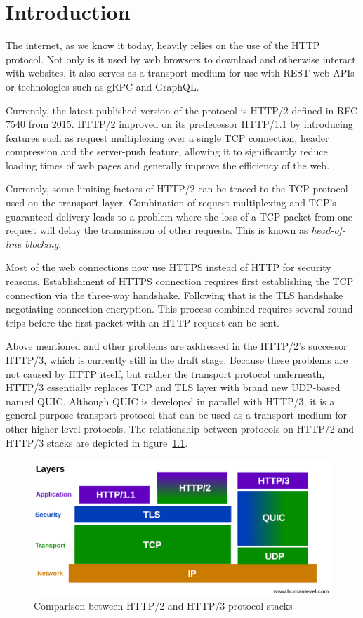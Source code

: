 \chapter{Introduction}

The internet, as we know it today, heavily relies on the use of the HTTP protocol. Not only is it
used by web browsers to download and otherwise interact with websites, it also serves as a transport
medium for use with REST web APIs or technologies such as gRPC and GraphQL\@.

Currently, the latest published version of the protocol is HTTP/2 defined in RFC 7540 from 2015.
HTTP/2 improved on its predecessor HTTP/1.1 by introducing features such as request multiplexing
over a single TCP connection, header compression and the server-push feature, allowing it to
significantly reduce loading times of web pages and generally improve the efficiency of the web.

Currently, some limiting factors of HTTP/2 can be traced to the TCP protocol used on the
transport layer. Combination of request multiplexing and TCP's guaranteed delivery leads to a
problem where the loss of a TCP packet from one request will delay the transmission of other
requests. This is known as \textit{head-of-line blocking}.

Most of the web connections now use HTTPS instead of HTTP for security reasons. Establishment of
HTTPS connection requires first establishing the TCP connection via the three-way handshake.
Following that is the TLS handshake negotiating connection encryption. This process combined
requires several round trips before the first packet with an HTTP request can be sent.

Above mentioned and other problems are addressed in the HTTP/2's successor HTTP/3, which is
currently still in the draft stage. Because these problems are not caused by HTTP itself, but rather
the transport protocol underneath, HTTP/3 essentially replaces TCP and TLS layer with brand new
UDP-based named QUIC\@. Although QUIC is developed in parallel with HTTP/3, it is a general-purpose
transport protocol that can be used as a transport medium for other higher level protocols. The
relationship between protocols on HTTP/2 and HTTP/3 stacks are depicted in
figure~\ref{fig:http2-vs-http3-stack}.

\begin{figure}[h]\label{fig:http2-vs-http3-stack}
  \centering
  \includegraphics[width=\textwidth]{img/01-pile-http-protocol}
  \caption{Comparison between HTTP/2 and HTTP/3 protocol stacks}
\end{figure}

